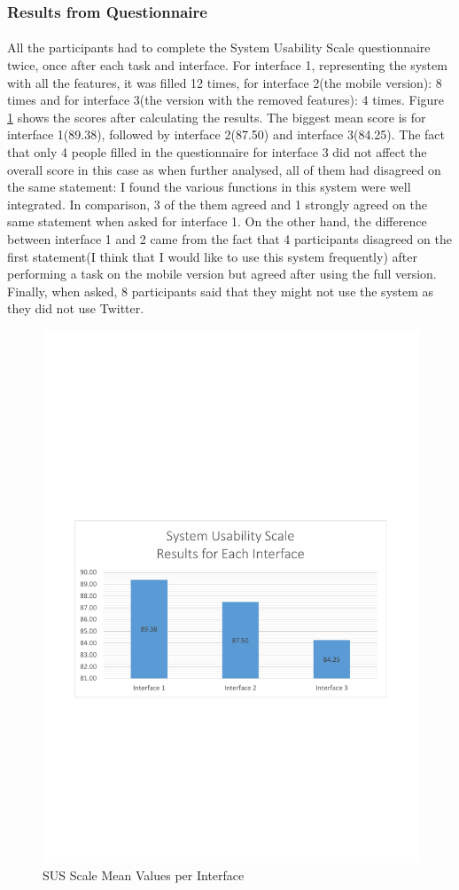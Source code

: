 \documentclass{l4proj}
\begin{document}
\subsubsection{Results from Questionnaire}
\paragraph{}
All the participants had to complete the System Usability Scale questionnaire twice, once after each task and interface. For interface 1, representing the system with all the features, it was filled 12 times, for interface 2(the mobile version): 8 times and for interface 3(the version with the removed features): 4 times. Figure \ref{fig:susresultsmean} shows the scores after calculating the results. The biggest mean score is for interface 1(89.38), followed by interface 2(87.50) and interface 3(84.25). The fact that only 4 people filled in the questionnaire for interface 3 did not affect the overall score in this case as when further analysed, all of them had disagreed on the same statement: I found the various functions in this system were well integrated. In comparison, 3 of the them agreed and 1 strongly agreed on the same statement when asked for interface 1. On the other hand, the difference between interface 1 and 2 came from the fact that 4 participants disagreed on the first statement(I think that I would like to use this system frequently) after performing a task on the mobile version but agreed after using the full version. Finally, when asked, 8 participants said that they might not use the system as they did not use Twitter.

\begin{figure}[H]
	\centering
	\includegraphics[width=.6\textwidth]{charts/SUSScaleMeanValues.pdf}
	\caption{SUS Scale Mean Values per Interface}
	\label{fig:susresultsmean}
\end{figure}
\end{document}
